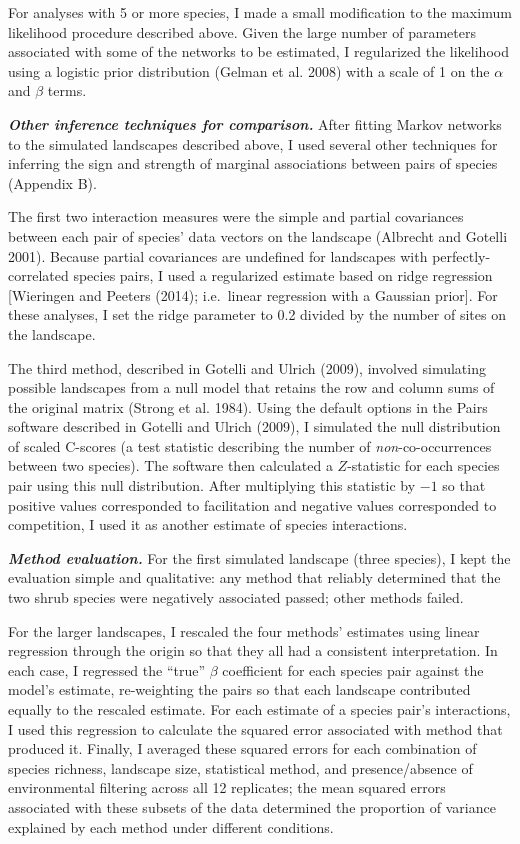 \documentclass[12pt,]{article}
\begin{document}
\begin{spacing}{1.9}
\begin{flushleft}
For analyses with 5 or more species, I made a small modification to the
maximum likelihood procedure described above. Given the large number of
parameters associated with some of the networks to be estimated, I
regularized the likelihood using a logistic prior distribution (Gelman
et al. 2008) with a scale of 1 on the \(\alpha\) and \(\beta\) terms.

\textbf{\emph{Other inference techniques for comparison.}} After fitting
Markov networks to the simulated landscapes described above, I used
several other techniques for inferring the sign and strength of marginal
associations between pairs of species (Appendix B).

The first two interaction measures were the simple and partial
covariances between each pair of species' data vectors on the landscape
(Albrecht and Gotelli 2001). Because partial covariances are undefined
for landscapes with perfectly-correlated species pairs, I used a
regularized estimate based on ridge regression {[}Wieringen and Peeters
(2014); i.e.~linear regression with a Gaussian prior{]}. For these
analyses, I set the ridge parameter to 0.2 divided by the number of
sites on the landscape.

The third method, described in Gotelli and Ulrich (2009), involved
simulating possible landscapes from a null model that retains the row
and column sums of the original matrix (Strong et al. 1984). Using the
default options in the Pairs software described in Gotelli and Ulrich
(2009), I simulated the null distribution of scaled C-scores (a test
statistic describing the number of \emph{non}-co-occurrences between two
species). The software then calculated a \(Z\)-statistic for each
species pair using this null distribution. After multiplying this
statistic by \(-1\) so that positive values corresponded to facilitation
and negative values corresponded to competition, I used it as another
estimate of species interactions.

\textbf{\emph{Method evaluation.}} For the first simulated landscape
(three species), I kept the evaluation simple and qualitative: any
method that reliably determined that the two shrub species were
negatively associated passed; other methods failed.

For the larger landscapes, I rescaled the four methods' estimates using
linear regression through the origin so that they all had a consistent
interpretation. In each case, I regressed the ``true'' \(\beta\)
coefficient for each species pair against the model's estimate,
re-weighting the pairs so that each landscape contributed equally to the
rescaled estimate. For each estimate of a species pair's interactions, I
used this regression to calculate the squared error associated with
method that produced it. Finally, I averaged these squared errors for
each combination of species richness, landscape size, statistical
method, and presence/absence of environmental filtering across all 12
replicates; the mean squared errors associated with these subsets of the
data determined the proportion of variance explained by each method
under different conditions.


\end{flushleft}
\end{spacing}
\end{document}
